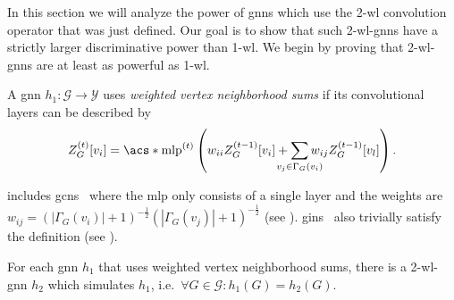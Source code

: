 In this section we will analyze the power of \acp{gnn} which use the 2-\acs{wl} convolution operator that was just defined.
Our goal is to show that such 2-\acs{wl}-\acsp{gnn} have a strictly larger discriminative power than 1-\acs{wl}.
We begin by proving that 2-\acs{wl}-\acsp{gnn} are at least as powerful as 1-\acs{wl}.

\begin{defn}\label{defn:ltd:vert-conv}
	A \ac{gnn} $h_1: \mathcal{G} \to \mathcal{Y}$ uses \textit{weighted vertex neighborhood sums} if its convolutional layers can be described by
	\begin{align*}
		Z_{G}^{(t)}[v_i] = \mathrm{\acs*{mlp}}^{(t)}\left( w_{ii} Z_{G}^{(t-1)}[v_i] + \smashoperator[lr]{\sum_{v_j \in \Gamma_G(v_i)}} w_{ij} Z_{G}^{(t-1)}[v_l] \right)
		\text{.}
	\end{align*}
\end{defn}
 includes \acp{gcn}~\cite{Kipf2017} where the \ac{mlp} only consists of a single layer and the weights are $w_{ij} = {\left(\left| \Gamma_G(v_i) \right| + 1\right)}^{-\frac{1}{2}}{\left(\left| \Gamma_G(v_j) \right| + 1\right)}^{-\frac{1}{2}}$ (see ).
\Acp{gin}~\cite{Xu2018} also trivially satisfy the definition (see ).
\begin{thm}\label{thm:ltd:wl2-simulation}
	For each \ac{gnn} $h_1$ that uses weighted vertex neighborhood sums, there is a 2-\acs{wl}-\acs{gnn} $h_2$ which simulates $h_1$, i.e.\ $\forall G \in \mathcal{G}: h_1(G) = h_2(G)$.
\end{thm}
